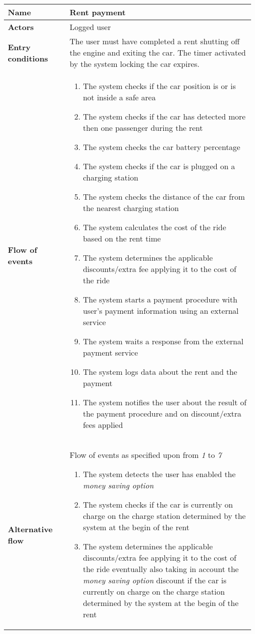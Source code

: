 \begin{longtable}{p{0.25\linewidth}p{0.75\linewidth}}
\toprule
\textbf{Name} & \textbf{Rent payment} \\
\midrule
\textbf{Actors} &  Logged user\\
\midrule
\textbf{Entry conditions} & 
The user must have completed a rent shutting off the engine and exiting the car. The timer activated by the system locking the car expires. \\
\midrule
\textbf{Flow of events} & 
\begin{enumerate}
	\item The system checks if the car position is or is not inside a safe area
	\item The system checks if the car has detected more then one passenger during the rent
	\item The system checks the car battery percentage
	\item The system checks if the car is plugged on a charging station
	\item The system checks the distance of the car from the nearest charging station
	\item The system calculates the cost of the ride based on the rent time
	\item The system determines the applicable discounts/extra fee applying it to the cost of the ride
	\item The system starts a payment procedure with user's payment information using
	an external service
	\item The system waits a response from the external payment service
	\item The system logs data about the rent and the payment
    \item The system notifies the user about the result of the payment procedure and on discount/extra fees applied
\end{enumerate} \\
\midrule
\textbf{Alternative flow} & 
Flow of events as specified upon from \emph{1} to \emph{7}
\begin{enumerate}[label=8 \alph*.]
	\item The system detects the user has enabled the \emph{money saving option}
	\item The system checks if the car is currently on charge on the charge station determined by the system at the begin of the rent
	\item The system determines the applicable discounts/extra fee applying it to the cost of the ride eventually also taking in account the \emph{money saving option} discount if the car is currently on charge on the charge station determined by the system at the begin of the rent

\end{enumerate}
\end{longtable}
